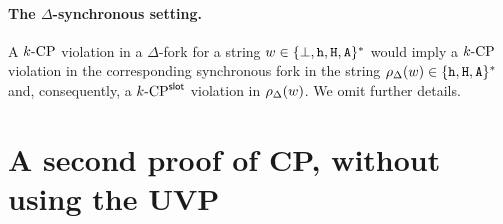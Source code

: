   \paragraph{The $\Delta$-synchronous setting.} 
  A ${k}\text{-}\mathrm{CP}$ violation in a $\Delta$-fork for a string $w \in \{\perp, \mathtt{h}, \mathtt{H}, \mathtt{A}\}^*$ 
  would imply 
  a ${k}\text{-}\mathrm{CP}$ violation in the corresponding synchronous fork 
  in the string $\rho_\Delta(w) \in \{\mathtt{h}, \mathtt{H}, \mathtt{A}\}^*$ 
  and, consequently, a ${k}\text{-}\mathrm{CP}^{\mathsf{slot}}$ violation in $\rho_\Delta(w)$. 
  We omit further details.


\section{A second proof of CP, without using the UVP}\label{sec:cp-nocatalan-multihonest}

